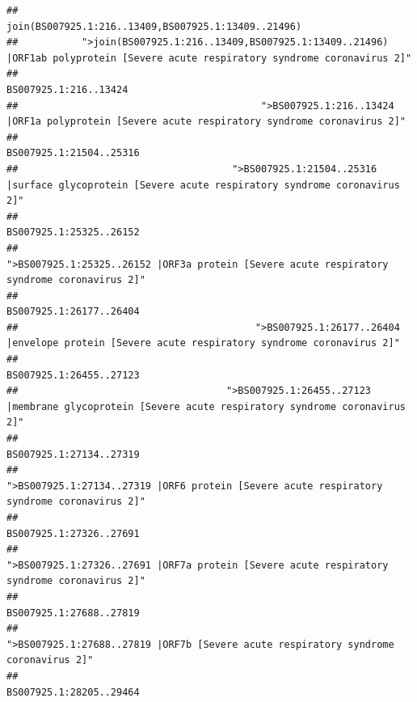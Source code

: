 \documentclass[
]{article}
\begin{document}
\begin{verbatim}
##                                                                                    join(BS007925.1:216..13409,BS007925.1:13409..21496) 
##           ">join(BS007925.1:216..13409,BS007925.1:13409..21496) |ORF1ab polyprotein [Severe acute respiratory syndrome coronavirus 2]" 
##                                                                                                                  BS007925.1:216..13424 
##                                          ">BS007925.1:216..13424 |ORF1a polyprotein [Severe acute respiratory syndrome coronavirus 2]" 
##                                                                                                                BS007925.1:21504..25316 
##                                     ">BS007925.1:21504..25316 |surface glycoprotein [Severe acute respiratory syndrome coronavirus 2]" 
##                                                                                                                BS007925.1:25325..26152 
##                                            ">BS007925.1:25325..26152 |ORF3a protein [Severe acute respiratory syndrome coronavirus 2]" 
##                                                                                                                BS007925.1:26177..26404 
##                                         ">BS007925.1:26177..26404 |envelope protein [Severe acute respiratory syndrome coronavirus 2]" 
##                                                                                                                BS007925.1:26455..27123 
##                                    ">BS007925.1:26455..27123 |membrane glycoprotein [Severe acute respiratory syndrome coronavirus 2]" 
##                                                                                                                BS007925.1:27134..27319 
##                                             ">BS007925.1:27134..27319 |ORF6 protein [Severe acute respiratory syndrome coronavirus 2]" 
##                                                                                                                BS007925.1:27326..27691 
##                                            ">BS007925.1:27326..27691 |ORF7a protein [Severe acute respiratory syndrome coronavirus 2]" 
##                                                                                                                BS007925.1:27688..27819 
##                                                    ">BS007925.1:27688..27819 |ORF7b [Severe acute respiratory syndrome coronavirus 2]" 
##                                                                                                                BS007925.1:28205..29464 

\end{verbatim}
\end{document}
